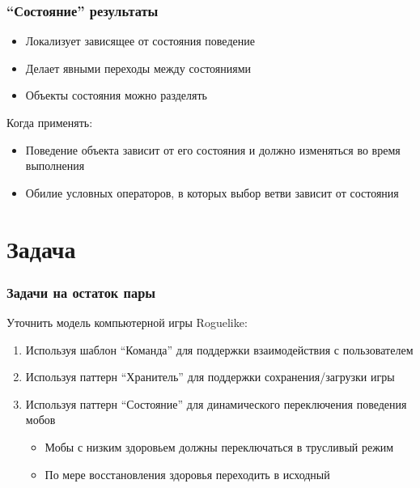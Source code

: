 \documentclass{../../slides-style}
\begin{document}
    \begin{frame}
        \frametitle{``Состояние'' результаты}
        \begin{itemize}
            \item Локализует зависящее от состояния поведение
            \item Делает явными переходы между состояниями
            \item Объекты состояния можно разделять
        \end{itemize}
        Когда применять:
        \begin{itemize}
            \item Поведение объекта зависит от его состояния и должно изменяться во время выполнения
            \item Обилие условных операторов, в которых выбор ветви зависит от состояния
        \end{itemize}
    \end{frame}

    \section{Задача}

    \begin{frame}
        \frametitle{Задачи на остаток пары}
        Уточнить модель компьютерной игры Roguelike:

        \begin{enumerate}
            \item Используя шаблон ``Команда'' для поддержки взаимодействия с пользователем
            \item Используя паттерн ``Хранитель'' для поддержки сохранения/загрузки игры
            \item Используя паттерн ``Состояние'' для динамического переключения поведения мобов
            \begin{itemize}
                \item Мобы с низким здоровьем должны переключаться в трусливый режим
                \item По мере восстановления здоровья переходить в исходный
            \end{itemize}
        \end{enumerate}
    \end{frame}
\end{document}
